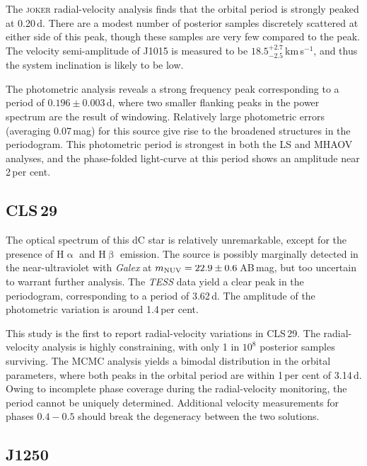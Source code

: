 \documentclass[fleqn,usenatbib,useAMS]{mnras}
\begin{document}
The \textsc{joker} radial-velocity analysis finds that the orbital period is strongly peaked at 0.20\,d.  There are a modest number of posterior samples discretely scattered at either side of this peak, though these samples are very few compared to the peak.  The velocity semi-amplitude of J1015 is measured to be $18.5^{+2.7}_{-2.5}$\,km\,s$^{-1}$, and thus the system inclination is likely to be low.

The photometric analysis reveals a strong frequency peak corresponding to a period of $0.196\pm0.003$\,d, where two smaller flanking peaks in the power spectrum are the result of windowing.  Relatively large photometric errors (averaging 0.07\,mag) for this source give rise to the broadened structures in the periodogram.  This photometric period is strongest in both the LS and MHAOV analyses, and the phase-folded light-curve at this period shows an amplitude near 2\,per cent.



\subsection{CLS\,29}

The optical spectrum of this dC star is relatively unremarkable, except for the presence of H$\upalpha$ and H$\upbeta$ emission.  The source is possibly marginally detected in the near-ultraviolet with \textit{Galex} at $m_{\rm NUV}=22.9\pm0.6$\,AB\,mag, but too uncertain to warrant further analysis.  The {\em TESS} data yield a clear peak in the periodogram, corresponding to a period of 3.62\,d.  The amplitude of the photometric variation is around 1.4\,per cent.  

This study is the first to report radial-velocity variations in CLS\,29.  The radial-velocity analysis is highly constraining, with only 1 in $10^8$ posterior samples surviving.  The MCMC analysis yields a bimodal distribution in the orbital parameters, where both peaks in the orbital period are within 1\,per cent of 3.14\,d.  Owing to incomplete phase coverage during the radial-velocity monitoring, the period cannot be uniquely determined.  Additional velocity measurements for phases $0.4-0.5$ should break the degeneracy between the two solutions.



\subsection{J1250}
\end{document}
